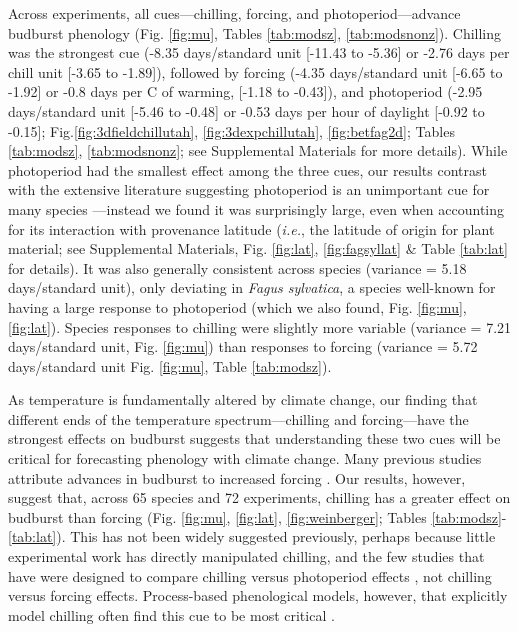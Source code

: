 \documentclass{article}
\begin{document}
\par Across experiments, all cues---chilling, forcing, and photoperiod---advance budburst phenology (Fig. \ref{fig:mu}, Tables \ref{tab:modsz}, \ref{tab:modsnonz}). Chilling was the strongest cue (-8.35 days/standard unit [-11.43 to -5.36] or -2.76 days per chill unit [-3.65 to -1.89]), followed by forcing (-4.35 days/standard unit [-6.65 to -1.92] or -0.8 days per \degree C of warming, [-1.18 to -0.43]), and photoperiod (-2.95 days/standard unit [-5.46 to -0.48] or -0.53 days per hour of daylight [-0.92 to -0.15]; Fig.\ref{fig:3dfieldchillutah}, \ref{fig:3dexpchillutah}, \ref{fig:betfag2d}; Tables \ref{tab:modsz}, \ref{tab:modsnonz}; see Supplemental Materials for more details). While photoperiod had the smallest effect among the three cues, our results contrast with the extensive literature suggesting photoperiod is an unimportant cue for many species \emph{\citep{zohner2016,fu2019}}---instead we found it was surprisingly large, even when accounting for its interaction with provenance latitude (\emph{i.e.}, the latitude of origin for plant material; see Supplemental Materials, Fig. \ref{fig:lat}, \ref{fig:fagsyllat} \& Table \ref{tab:lat} for details). It was also generally consistent across species (variance = 5.18 days/standard unit), only deviating in \emph{Fagus sylvatica}, a species well-known for having a large response to photoperiod (which we also found, Fig. \ref{fig:mu}, \ref{fig:lat}). Species responses to chilling were slightly more variable (variance = 7.21 days/standard unit, Fig. \ref{fig:mu}) than responses to forcing (variance = 5.72 days/standard unit Fig. \ref{fig:mu}, Table \ref{tab:modsz}). 

\par As temperature is fundamentally altered by climate change, our finding that different ends of the temperature spectrum---chilling and forcing---have the strongest effects on budburst suggests that understanding these two cues will be critical for forecasting phenology with climate change. Many previous studies attribute advances in budburst to increased forcing \emph{\citep{menzel2006,harrington2015,Basler:2014aa,bradley1999}}. Our results, however, suggest that, across 65 species and 72 experiments, chilling has a greater effect on budburst than forcing (Fig. \ref{fig:mu}, \ref{fig:lat}, \ref{fig:weinberger}; Tables \ref{tab:modsz}-\ref{tab:lat}). This has not been widely suggested previously, perhaps because little experimental work has directly manipulated chilling, and the few studies that have were designed to compare chilling versus photoperiod effects \emph{\citep[e.g.,][]{zohner2016,Basler:2014aa,Caffarra:2011qf,Laube:2014a}}, not chilling versus forcing effects. Process-based phenological models, however, that explicitly model chilling often find this cue to be most critical \emph{\citep[e.g.,][]{gauzere2019,Laube:2014a,Heide:2005aa}}.
\end{document}
